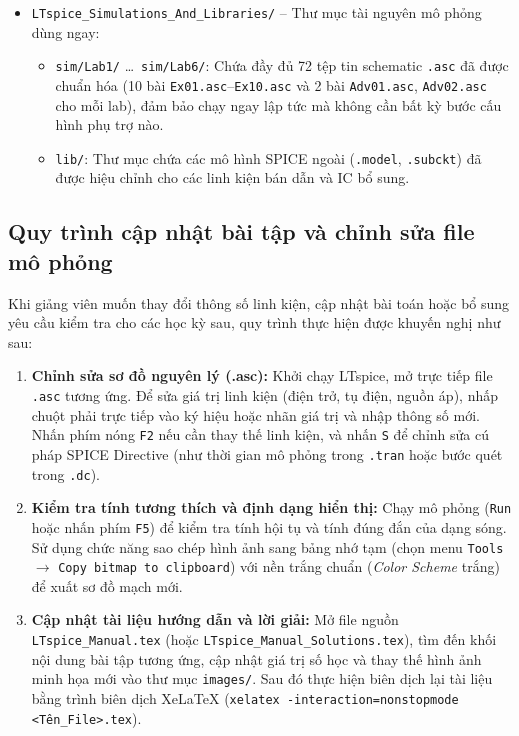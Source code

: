 \documentclass[12pt,a4paper]{article}
\begin{document}
\begin{itemize}[itemsep=2pt]
\begin{itemize}[itemsep=1pt]
      \item \texttt{LTspice\_Installation\_Guide.pdf}: Cẩm nang hướng dẫn sinh viên và kỹ thuật viên phòng máy cài đặt gói offline và tích hợp thư viện.
    \end{itemize}
  \item \texttt{LTspice\_Simulations\_And\_Libraries/} -- Thư mục tài nguyên mô phỏng dùng ngay:
    \begin{itemize}[itemsep=1pt]
      \item \texttt{sim/Lab1/} \dots\ \texttt{sim/Lab6/}: Chứa đầy đủ 72 tệp tin schematic \texttt{.asc} đã được chuẩn hóa (10 bài \texttt{Ex01.asc}--\texttt{Ex10.asc} và 2 bài \texttt{Adv01.asc}, \texttt{Adv02.asc} cho mỗi lab), đảm bảo chạy ngay lập tức mà không cần bất kỳ bước cấu hình phụ trợ nào.
      \item \texttt{lib/}: Thư mục chứa các mô hình SPICE ngoài (\texttt{.model}, \texttt{.subckt}) đã được hiệu chỉnh cho các linh kiện bán dẫn và IC bổ sung.
    \end{itemize}
\end{itemize}

\subsection{Quy trình cập nhật bài tập và chỉnh sửa file mô phỏng}
Khi giảng viên muốn thay đổi thông số linh kiện, cập nhật bài toán hoặc bổ sung yêu cầu kiểm tra cho các học kỳ sau, quy trình thực hiện được khuyến nghị như sau:
\begin{enumerate}[label=\arabic*., itemsep=2pt]
  \item \textbf{Chỉnh sửa sơ đồ nguyên lý (.asc):}
    Khởi chạy LTspice, mở trực tiếp file \texttt{.asc} tương ứng. Để sửa giá trị linh kiện (điện trở, tụ điện, nguồn áp), nhấp chuột phải trực tiếp vào ký hiệu hoặc nhãn giá trị và nhập thông số mới. Nhấn phím nóng \texttt{F2} nếu cần thay thế linh kiện, và nhấn \texttt{S} để chỉnh sửa cú pháp SPICE Directive (như thời gian mô phỏng trong \texttt{.tran} hoặc bước quét trong \texttt{.dc}).
  \item \textbf{Kiểm tra tính tương thích và định dạng hiển thị:}
    Chạy mô phỏng (\texttt{Run} hoặc nhấn phím \texttt{F5}) để kiểm tra tính hội tụ và tính đúng đắn của dạng sóng. Sử dụng chức năng sao chép hình ảnh sang bảng nhớ tạm (chọn menu \texttt{Tools} $\rightarrow$ \texttt{Copy bitmap to clipboard}) với nền trắng chuẩn (\textit{Color Scheme} trắng) để xuất sơ đồ mạch mới.
  \item \textbf{Cập nhật tài liệu hướng dẫn và lời giải:}
    Mở file nguồn \texttt{LTspice\_Manual.tex} (hoặc \texttt{LTspice\_Manual\_Solutions.tex}), tìm đến khối nội dung bài tập tương ứng, cập nhật giá trị số học và thay thế hình ảnh minh họa mới vào thư mục \texttt{images/}. Sau đó thực hiện biên dịch lại tài liệu bằng trình biên dịch XeLaTeX (\texttt{xelatex -interaction=nonstopmode <T\^{e}n\_File>.tex}).
\end{enumerate}
\end{document}

